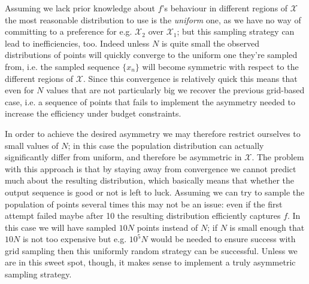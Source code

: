 Assuming we lack prior knowledge about $f$'s behaviour in different regions of $\mathcal{X}$ the most reasonable distribution to use is the \emph{uniform} one, as we have no way of committing to a preference for e.g. $\mathcal{X}_2$ over $\mathcal{X}_1$; but this sampling strategy can lead to inefficiencies, too. Indeed unless $N$ is quite small the observed distributions of points will quickly converge to the uniform one they're sampled from, i.e. the sampled sequence $\{x_n\}$ will become symmetric with respect to the different regions of $\mathcal{X}$. Since this convergence is relatively quick this means that even for $N$ values that are not particularly big we recover the previous grid-based case, i.e. a sequence of points that fails to implement the asymmetry needed to increase the efficiency under budget constraints.

In order to achieve the desired asymmetry we may therefore restrict ourselves to small values of $N$; in this case the population distribution can actually significantly differ from uniform, and therefore be asymmetric in $\mathcal{X}$. The problem with this approach is that by staying away from convergence we cannot predict much about the resulting distribution, which basically means that whether the output sequence is good or not is left to luck. Assuming we can try to sample the population of points several times this may not be an issue: even if the first attempt failed maybe after 10 the resulting distribution efficiently captures $f$. In this case we will have sampled $10N$ points instead of $N$; if $N$ is small enough that $10N$ is not too expensive but e.g. $10^5N$ would be needed to ensure success with grid sampling then this uniformly random strategy can be successful. Unless we are in this sweet spot, though, it makes sense to implement a truly asymmetric sampling strategy.


